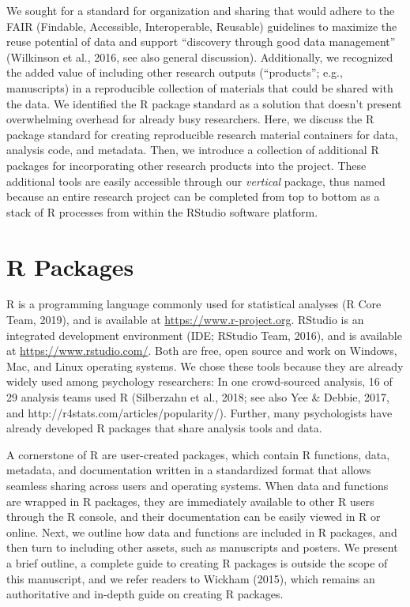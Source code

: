 \documentclass[
  english,
  jou,floatsintext]{apa6}
\begin{document}
We sought for a standard for organization and sharing that would adhere to the FAIR (Findable, Accessible, Interoperable, Reusable) guidelines to maximize the reuse potential of data and support ``discovery through good data management'' (Wilkinson et al., 2016, see also general discussion). Additionally, we recognized the added value of including other research outputs (``products''; e.g., manuscripts) in a reproducible collection of materials that could be shared with the data. We identified the R package standard as a solution that doesn't present overwhelming overhead for already busy researchers. Here, we discuss the R package standard for creating reproducible research material containers for data, analysis code, and metadata. Then, we introduce a collection of additional R packages for incorporating other research products into the project. These additional tools are easily accessible through our \emph{vertical} package, thus named because an entire research project can be completed from top to bottom as a stack of R processes from within the RStudio software platform.

\hypertarget{r-packages}{%
\section{R Packages}\label{r-packages}}

R is a programming language commonly used for statistical analyses (R Core Team, 2019), and is available at \url{https://www.r-project.org}. RStudio is an integrated development environment (IDE; RStudio Team, 2016), and is available at \url{https://www.rstudio.com/}. Both are free, open source and work on Windows, Mac, and Linux operating systems. We chose these tools because they are already widely used among psychology researchers: In one crowd-sourced analysis, 16 of 29 analysis teams used R (Silberzahn et al., 2018; see also Yee \& Debbie, 2017, and http://r4stats.com/articles/popularity/). Further, many psychologists have already developed R packages that share analysis tools and data.

A cornerstone of R are user-created packages, which contain R functions, data, metadata, and documentation written in a standardized format that allows seamless sharing across users and operating systems. When data and functions are wrapped in R packages, they are immediately available to other R users through the R console, and their documentation can be easily viewed in R or online. Next, we outline how data and functions are included in R packages, and then turn to including other assets, such as manuscripts and posters. We present a brief outline, a complete guide to creating R packages is outside the scope of this manuscript, and we refer readers to Wickham (2015), which remains an authoritative and in-depth guide on creating R packages.
\end{document}
